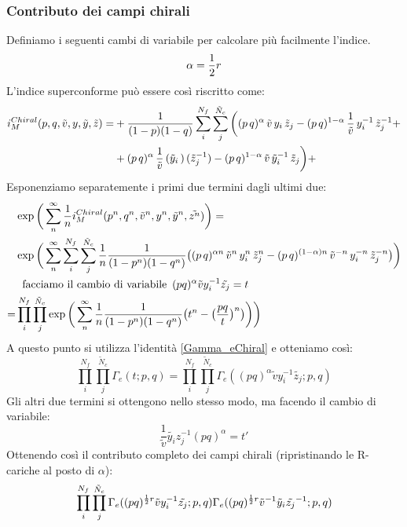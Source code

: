 \documentclass[a4paper,12pt]{article}
\begin{document}
\subsubsection{Contributo dei campi chirali}
Definiamo i seguenti cambi di variabile per calcolare più facilmente l'indice.
$$
	\alpha = {1 \over 2 } r
$$
	L'indice superconforme può essere così riscritto come:
\begin{align*}
 i_M^{Chiral}  (p,q, \tilde v, y,\tilde y ,\tilde z) = &
 +{1\over (1-p)(1-q)} \sum_i^{N_f}\sum_j^{\tilde N_c} \bigg( (p\,q)^{\alpha} \,\tilde v \, y_i\, \tilde z_j
- (p\,q)^{1- \alpha} \, {1 \over \tilde v}\, y_i^{-1} \,
\tilde z_j^{-1} + \\
& + (p\,q)^{\alpha}\, {1\over \tilde v}\,
({\tilde y_i}\,) \,
(\tilde z_j^{-1})
- (p\,q)^{1- \alpha} \, \tilde v \,
{\tilde y_i}^{-1} \,
\tilde z_j \bigg) + \\
\end{align*}
Esponenziamo separatemente i primi due termini dagli ultimi due:
\begin{align*}
&\exp \bigg( \sum_{n}^{\infty} \frac{1}{n} i_M^{Chiral} (p^n,q^n, \tilde v^n, y^n,\tilde y^n ,\tilde{z^n} ) \bigg)  = \\
& \exp \bigg( \sum_{n}^{\infty} \sum_i^{N_f}\sum_j^{\tilde N_c}  \frac{1}{n}    {1\over (1-p^n)(1-q^n)} \big( (p \, q)^{\alpha n} \,\tilde v^n \, y_i^n\, \tilde z_j^n
- (p\,q)^{(1- \alpha)n} \, \tilde v^{-n}\, y_i^{-n} \,
\tilde z_j^{-n} \big) \bigg) \\
& \; \mbox{ facciamo il cambio di variabile } \, (pq)^{\alpha} \tilde{v} y_i^{-1} \tilde{z_j} = t \\
=& \prod_i^{N_f}\prod_j^{\tilde N_c}  \exp \bigg( \sum_{n}^{\infty} \frac{1}{n}   {1\over (1-p^n)(1-q^n)} \big( t^n - \big( \frac{pq}{t} \big)^n \big) \bigg) \bigg)
\end{align*}
A questo punto si utilizza l'identità \ref{Gamma_eChiral} e otteniamo così:
\begin{equation}
	\prod_i^{N_f}\prod_j^{\tilde N_c} \Gamma_e ( t ; p,q) = \prod_i^{N_f}\prod_j^{\tilde N_c} \Gamma_e ( (pq)^{\alpha} \tilde{v} y_i^{-1} \tilde{z_j} ; p,q)
\end{equation}
Gli altri due termini si ottengono nello stesso modo, ma facendo il cambio di variabile:
$$
	\frac{1}{\tilde v } \tilde{y_i} z_j^{-1} (pq)^{\alpha} = t'
$$
Ottenendo così il contributo completo dei campi chirali (ripristinando le R-cariche al posto di $\alpha$):
\begin{equation}
\prod_i^{N_f}\prod_j^{\tilde N_c} \Gamma_e ( (pq)^{{1 \over 2 } r} \tilde{v} y_i^{-1} \tilde{z_j} ; p,q)\Gamma_e ( (pq)^{{1 \over 2 } r} \tilde{v}^{-1} \tilde y_i \tilde{z_j}^{-1} ; p,q)
\end{equation}
\end{document}
